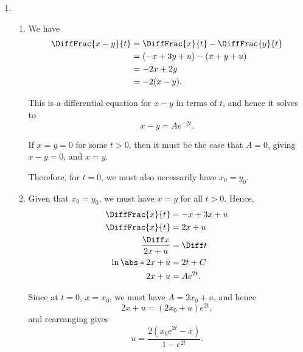 \Question{\currfilebase}

\begin{enumerate}
    \item \begin{enumerate}
              \item We have
                    \begin{align*}
                        \DiffFrac{x - y}{t} & = \DiffFrac{x}{t} - \DiffFrac{y}{t} \\
                                            & = (-x + 3y + u) - (x + y + u)       \\
                                            & = -2x + 2y                          \\
                                            & = -2 (x - y).
                    \end{align*}

                    This is a differential equation for \(x - y\) in terms of \(t\), and hence it solves to
                    \[
                        x - y = A e^{-2t}.
                    \]

                    If \(x = y = 0\) for some \(t > 0\), then it must be the case that \(A = 0\), giving \(x - y = 0\), and \(x = y\).

                    Therefore, for \(t = 0\), we must also necessarily have \(x_0 = y_0\).

              \item Given that \(x_0 = y_0\), we must have \(x = y\) for all \(t > 0\). Hence,
                    \begin{align*}
                        \DiffFrac{x}{t}        & = -x + 3x + u \\
                        \DiffFrac{x}{t}        & = 2x + u      \\
                        \frac{\Diff x}{2x + u} & = \Diff t     \\
                        \ln \abs*{2x + u}      & = 2 t + C     \\
                        2x + u                 & = A e^{2t}.
                    \end{align*}

                    Since at \(t = 0\), \(x = x_0\), we must have \(A = 2 x_0 + u\), and hence
                    \[
                        2x + u = (2x_0 + u) e^{2t},
                    \]
                    and rearranging gives
                    \[
                        u = \frac{2 (x_0 e^{2t} - x)}{1 - e^{2t}}.
                    \]


\end{enumerate}
\end{enumerate}
